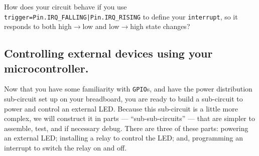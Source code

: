 \begin{enumerate}
	\smallskip
	How does your circuit behave if you use \lstinline{trigger=Pin.IRQ_FALLING|Pin.IRQ_RISING} to define your \texttt{interrupt}, so it responds to both high$\rightarrow$low and low$\rightarrow$high state changes?
\end{enumerate}



\subsection{Controlling external devices using your microcontroller.}
Now that you have some familiarity with \texttt{GPIO}s, and have the power distribution sub-circuit set up on your breadboard, you are ready to build a sub-circuit to power and control an external LED.
Because this sub-circuit is a little more complex, we will construct it in parts --- ``sub-sub-circuits'' --- that are simpler to assemble, test, and if necessary debug.
There are three of these parts: powering an external LED; installing a relay to control the LED; and, programming an interrupt to switch the relay on and off.

